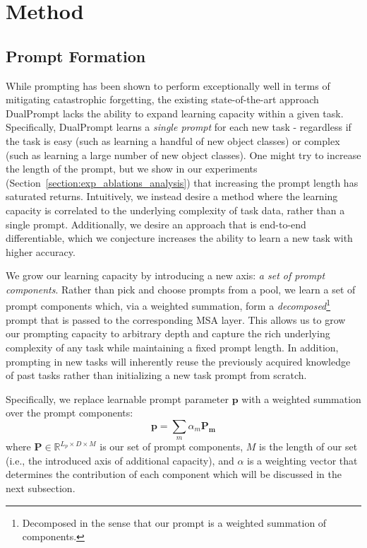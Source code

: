 \section{Method}
\label{sec:method}



\subsection{Prompt Formation}

While prompting has been shown to perform exceptionally well in terms of mitigating catastrophic forgetting, the existing state-of-the-art approach DualPrompt lacks the ability to expand learning capacity within a given task. Specifically, DualPrompt learns a \emph{single prompt} for each new task - regardless if the task is easy (such as learning a handful of new object classes) or complex (such as learning a large number of new object classes). One might try to increase the length of the prompt, but we show in our experiments (Section~\ref{section:exp_ablations_analysis}) that increasing the prompt length has saturated returns. Intuitively, we instead desire a method where the learning capacity is correlated to the underlying complexity of task data, rather than a single prompt. Additionally, we desire an approach that is end-to-end differentiable, which we conjecture increases the ability to learn a new task with higher accuracy.

We grow our learning capacity by introducing a new axis: \emph{a set of prompt components}. Rather than pick and choose prompts from a pool, we learn a set of prompt components which, via a weighted summation, form a \emph{decomposed}\footnote{Decomposed in the sense that our prompt is a weighted summation of components.} prompt that is passed to the corresponding MSA layer. This allows us to grow our prompting capacity to arbitrary depth and capture the rich underlying complexity of any task while maintaining a fixed prompt length. In addition, prompting in new tasks will inherently reuse the previously acquired knowledge of past tasks rather than initializing a new task prompt from scratch. 

Specifically, we replace learnable prompt parameter $\bm{p}$ with a weighted summation over the prompt components:
\begin{equation}
\bm{p} = \sum_{m} \alpha_m \bm{P_m}
\label{eq:prompt_f}
\end{equation}
where $\bm{P} \in \mathbb{R}^{L_{p} \times D \times M}$ is our set of prompt components, $M$ is the length of our set (i.e., the introduced axis of additional capacity), and $\alpha$ is a weighting vector that determines the contribution of each component which will be discussed in the next subsection.

